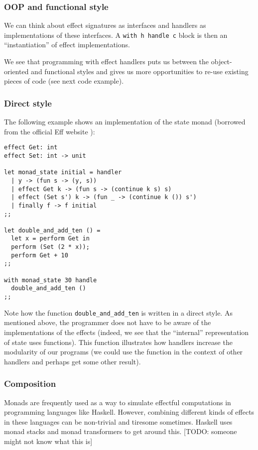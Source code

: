 \documentclass[class=article,crop=false,11pt]{standalone}
\begin{document}
\subsubsection{OOP and functional style}

We can think about effect signatures as interfaces and handlers as implementations of these interfaces.
A \verb|with h handle c| block is then an ``instantiation'' of effect implementations.

We see that programming with effect handlers puts us between the object-oriented and functional styles and gives us more opportunities to re-use existing pieces of code (see next code example).

\subsubsection{Direct style}

The following example shows an implementation of the state monad (borrowed from the official Eff website \cite{eff-website}):
\begin{verbatim}
effect Get: int
effect Set: int -> unit

let monad_state initial = handler
  | y -> (fun s -> (y, s))
  | effect Get k -> (fun s -> (continue k s) s)
  | effect (Set s') k -> (fun _ -> (continue k ()) s')
  | finally f -> f initial
;;

let double_and_add_ten () =
  let x = perform Get in
  perform (Set (2 * x));
  perform Get + 10
;;

with monad_state 30 handle
  double_and_add_ten ()
;;
\end{verbatim}

Note how the function \verb|double_and_add_ten| is written in a direct style. As mentioned above, the programmer does not have to 
be aware of the implementations of the effects (indeed, we see that the ``internal'' representation of state uses functions). 
This function illustrates how handlers increase the modularity of our programs (we could use the function in the context of other handlers 
and perhaps get some other result).

\subsubsection{Composition}

Monads are frequently used as a way to simulate effectful computations in programming languages like Haskell. 
However, combining different kinds of effects in these languages can be non-trivial and 
tiresome sometimes. Haskell uses monad stacks and monad transformers to get around this. [TODO: someone might not know what this is]
\end{document}

